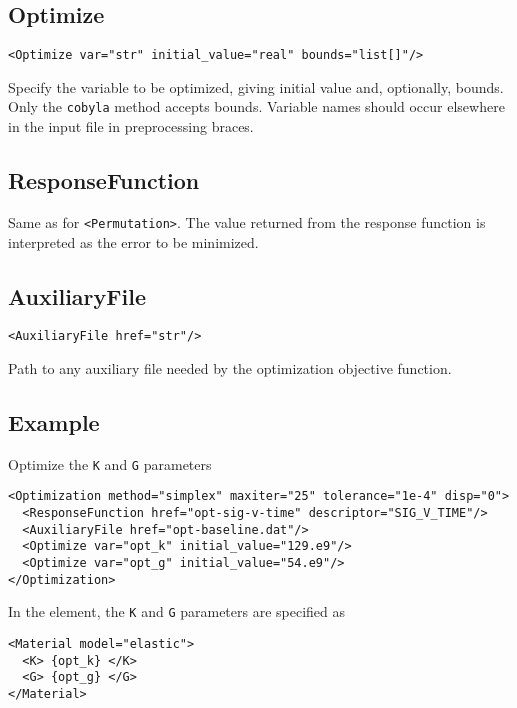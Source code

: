 \documentclass[11pt]{report}
\renewcommand{\tag}[1]{\texttt{<#1>}}
\newcommand{\reqdtag}[1]{\Red{\texttt{<#1>}}}
\begin{document}
\subsection{Optimize}
\begin{verbatim}
<Optimize var="str" initial_value="real" bounds="list[]"/>
\end{verbatim}
%
Specify the variable to be optimized, giving initial value and, optionally,
bounds.  Only the \texttt{cobyla} method accepts bounds.  Variable names should
occur elsewhere in the input file in preprocessing braces.

\subsection{ResponseFunction}
Same as for \tag{Permutation}.  The value returned from the response function
is interpreted as the error to be minimized.

\subsection{AuxiliaryFile}
\begin{verbatim}
<AuxiliaryFile href="str"/>
\end{verbatim}
Path to any auxiliary file needed by the optimization objective function.

\subsection{Example}
Optimize the \texttt{K} and \texttt{G} parameters
\begin{verbatim}
<Optimization method="simplex" maxiter="25" tolerance="1e-4" disp="0">
  <ResponseFunction href="opt-sig-v-time" descriptor="SIG_V_TIME"/>
  <AuxiliaryFile href="opt-baseline.dat"/>
  <Optimize var="opt_k" initial_value="129.e9"/>
  <Optimize var="opt_g" initial_value="54.e9"/>
</Optimization>
\end{verbatim}

In the \reqdtag{Material} element, the \texttt{K} and \texttt{G} parameters
are specified as
%
\begin{verbatim}
<Material model="elastic">
  <K> {opt_k} </K>
  <G> {opt_g} </G>
</Material>
\end{verbatim}
\end{document}
